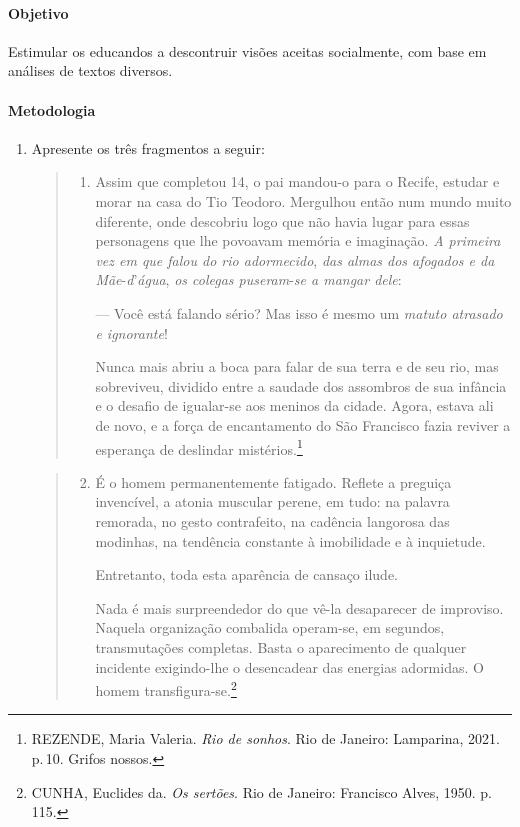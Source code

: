 \documentclass[12pt]{extarticle}
\begin{document}
\paragraph{Objetivo}
Estimular os educandos a descontruir visões aceitas socialmente, com
base em análises de textos diversos.

\paragraph{Metodologia}
\begin{enumerate}
\item Apresente os três fragmentos a seguir:

\begin{quote}
\begin{enumerate}
\item Assim que completou 14, o pai mandou-o para o Recife, estudar e
morar na casa do Tio Teodoro. Mergulhou então num mundo muito
diferente, onde descobriu logo que não havia lugar para essas
personagens que lhe povoavam memória e imaginação. \emph{A primeira
vez em que falou do rio adormecido}, \emph{das almas dos afogados e
da Mãe}-\emph{d}'\emph{água}, \emph{os colegas puseram}-\emph{se a
mangar dele}:

--- Você está falando sério? Mas isso é mesmo um \emph{matuto atrasado
e ignorante}!

Nunca mais abriu a boca para falar de sua terra e de seu rio, mas
sobreviveu, dividido entre a saudade dos assombros de sua infância e
o desafio de igualar-se aos meninos da cidade. Agora, estava ali de
novo, e a força de encantamento do São Francisco fazia reviver a
esperança de deslindar mistérios.\footnote{REZENDE, Maria Valeria. \emph{Rio de sonhos}. Rio de Janeiro: Lamparina, 2021. p.\,10. Grifos nossos.}
\end{enumerate}
\end{quote}

\begin{quote}
\begin{enumerate}
\setcounter{enumii}{1}
\item É o homem permanentemente fatigado. Reflete a preguiça invencível, a
atonia muscular perene, em tudo: na palavra remorada, no gesto
contrafeito, na cadência langorosa das modinhas, na tendência
constante à imobilidade e à inquietude.

Entretanto, toda esta aparência de cansaço ilude.

Nada é mais surpreendedor do que vê-la desaparecer de improviso.
Naquela organização combalida operam-se, em segundos, transmutações
completas. Basta o aparecimento de qualquer incidente exigindo-lhe o
desencadear das energias adormidas. O homem transfigura-se.\footnote{CUNHA, Euclides da. \emph{Os sertões}. Rio de Janeiro: Francisco Alves, 1950. p.\,115.}
\end{enumerate}
\end{quote}


\end{enumerate}
\end{document}
